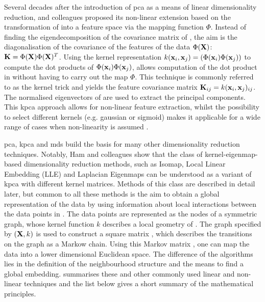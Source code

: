 Several decades after the introduction of \gls{pca} as a means of linear dimensionality reduction, \citet{Schoelkopf1998} and colleagues proposed its non-linear extension based on the transformation of  into a feature space  via the mapping function  \(\Phi\). Instead of finding the eigendecomposition of the covariance matrix of , the aim is the diagonalisation of the covariance  of the features of the data \(\Phi(\boldsymbol{\mathbf{X}})\): \(\boldsymbol{\mathbf{K}} = \Phi(\boldsymbol{\mathbf{X}})\Phi(\boldsymbol{\mathbf{X}})^T\). Using the kernel representation \(k(\boldsymbol{\mathbf{x}}_{i}, \boldsymbol{\mathbf{x}}_{j}) = (\Phi(\boldsymbol{\mathbf{x}}_{i})\Phi(\boldsymbol{\mathbf{x}}_{j}))\) to compute the dot products of \(\Phi(\boldsymbol{\mathbf{x}}_{i})\Phi(\boldsymbol{\mathbf{x}}_{j})\), allows computation of the dot product in  without having to carry out the map \(\Phi\). This technique is commonly referred to as the kernel trick and yields the feature covariance matrix \(\boldsymbol{\mathbf{K}}_{ij} = k(\boldsymbol{\mathbf{x}}_{i}, \boldsymbol{\mathbf{x}}_{j})_{ij}\). The normalised eigenvectors of  are used to extract the principal components. This \gls{kpca} approach allows for non-linear feature extraction, whilst the possibility to select different kernels (e.g. gaussian or sigmoid) makes it applicable for a wide range of cases when non-linearity is assumed \citep{Schoelkopf1998}.

\gls{pca}, \gls{kpca} and \gls{mds} build the basis for many other dimensionality reduction techniques. Notably, Ham and colleagues show that the class of kernel-eigenmap-based dimensionality reduction methods, such as Isomap, Local Linear Embedding (LLE) and Laplacian Eigenmaps can be understood as a variant of \gls{kpca} with different kernel matrices. Methods of this class are described in detail later, but common to all these methods is the aim to obtain a global representation of the data  by using information about local interactions between the data points in . The data points are represented as the nodes of a symmetric graph, whose kernel function \(k\) describes a local geometry of . The graph specified by \((\boldsymbol{\mathbf{X}}, k)\) is used to construct a square matrix , which describes the transitions on the graph as a Markow chain. Using this Markov matrix , one can map the data into a lower dimensional Euclidean space. The difference of the algorithms lies in the definition of the neighbourhood structure and the means to find a global embedding.  summarises these and other commonly used linear and non-linear techniques and the list below gives a short summary of the mathematical principles. 

